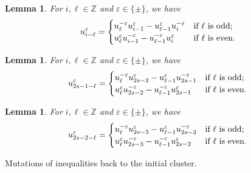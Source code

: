 \documentclass{amsart}
\newtheorem{lemma}[theorem]{Lemma}
\numberwithin{theorem}{section}
\newcommand{\ZZ}{\mathbb{Z}}
\begin{document}
  \begin{lemma}
    For $i,\ell\in\ZZ$ and $\varepsilon\in\{\pm\}$, we have
    \begin{equation}
      \label{eq:long Chebyshev recursion}
      u_{i-\ell}^\varepsilon=\begin{cases} u_{\ell}^{-\varepsilon} u_{i-1}^\varepsilon-u_{\ell-1}^\varepsilon u_i^{-\varepsilon} & \text{\upshape if $\ell$ is odd;}\\ u_{\ell}^\varepsilon u_{i-1}^{-\varepsilon}-u_{\ell-1}^{-\varepsilon} u_i^\varepsilon & \text{\upshape if $\ell$ is even.} \end{cases}
    \end{equation}
  \end{lemma}
  \begin{lemma}
    For $i,\ell\in\ZZ$ and $\varepsilon\in\{\pm\}$, we have
    \begin{equation}
      \label{eq:long Chebyshev recursion}
      u_{2s-1-\ell}^\varepsilon=\begin{cases} u_{\ell}^{-\varepsilon} u_{2s-2}^\varepsilon-u_{\ell-1}^\varepsilon u_{2s-1}^{-\varepsilon} & \text{\upshape if $\ell$ is odd;}\\ u_{\ell}^\varepsilon u_{2s-2}^{-\varepsilon}-u_{\ell-1}^{-\varepsilon} u_{2s-1}^\varepsilon & \text{\upshape if $\ell$ is even.} \end{cases}
    \end{equation}
  \end{lemma}
  \begin{lemma}
    For $i,\ell\in\ZZ$ and $\varepsilon\in\{\pm\}$, we have
    \begin{equation}
      \label{eq:long Chebyshev recursion}
      u_{2s-2-\ell}^\varepsilon=\begin{cases} u_{\ell}^{-\varepsilon} u_{2s-3}^\varepsilon-u_{\ell-1}^\varepsilon u_{2s-2}^{-\varepsilon} & \text{\upshape if $\ell$ is odd;}\\ u_{\ell}^\varepsilon u_{2s-3}^{-\varepsilon}-u_{\ell-1}^{-\varepsilon} u_{2s-2}^\varepsilon & \text{\upshape if $\ell$ is even.} \end{cases}
    \end{equation}
  \end{lemma}


  Mutations of inequalities back to the initial cluster.
\end{document}
